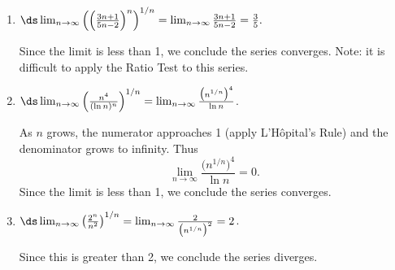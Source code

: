 {\begin{enumerate}
	\item $\ds\lim_{n\to\infty} \left(\left(\frac{3n+1}{5n-2}\right)^n\right)^{1/n} = \lim_{n\to\infty} \frac{3n+1}{5n-2} = \frac 35.$ 
	
	Since the limit is less than 1, we conclude the series converges. Note: it is difficult to apply the Ratio Test to this series.
	
	\item		$\ds\lim_{n\to\infty} \left(\frac{n^4}{(\ln n)^n}\right)^{1/n} = \lim_{n\to\infty} \frac {\big(n^{1/n}\big)^4}{\ln n}  $. 
	
	As $n$ grows, the numerator approaches 1 (apply L'H\^opital's Rule) and the denominator 
	grows to infinity.  Thus $$ \lim_{n\to\infty} \frac{\big(n^{1/n}\big)^4}{\ln n} = 0.$$ Since the limit is less than 1, we conclude the series converges.
	
	\item		$\ds \lim_{n\to\infty} \left(\frac{2^n}{n^2}\right)^{1/n} = \lim_{n\to\infty} \frac{2}{\big(n^{1/n}\big)^2} = 2$. 
	
	Since this is greater than 2, we conclude the series diverges.
\end{enumerate}
\baselineskip
}\\




